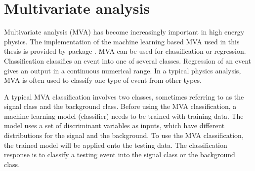 \section{Multivariate analysis}
\label{sec:pandoraMVA}

Multivariate analysis (MVA) has become increasingly important in high energy physics. The implementation of the machine learning based MVA used in this thesis is provided by  \TMVA package \cite{Hocker:2007ht,Therhaag:2009dp}.
MVA can be used for classification or regression. Classification classifies an event into one of several classes. Regression of an event  gives an output in a continuous numerical range. In a typical physics analysis, MVA is often used to classify one type of event from other types.



A typical MVA classification involves two classes, sometimes referring to as the signal class and the background class. Before using the MVA classification, a machine learning model (classifier) needs to be trained with training data. The model uses a set of discriminant variables as inputs, which have different distributions for the signal and the background. To use the MVA classification, the trained model will be applied onto the testing data. The classification response is to classify a testing event into the signal class or the background class.

